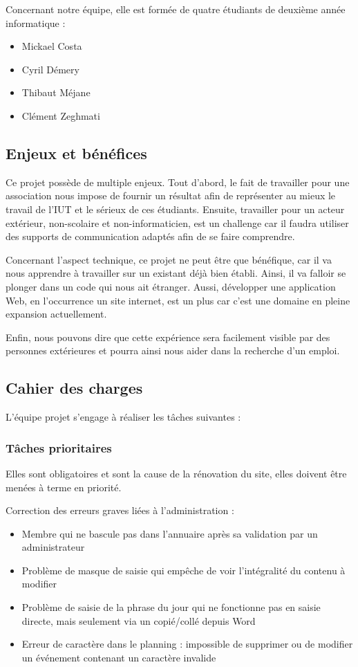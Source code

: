 \documentclass[11pt]{report}
\begin{document}
\par Concernant notre équipe, elle est formée de quatre étudiants de deuxième 
année informatique : 
\begin{itemize}
    \item Mickael Costa
    \item Cyril Démery
    \item Thibaut Méjane
    \item Clément Zeghmati
\end{itemize}


\subsection{Enjeux et bénéfices}
Ce projet possède de multiple enjeux. Tout d'abord, le fait de travailler pour 
une association nous impose de fournir un résultat afin de représenter au mieux 
le travail de l'IUT et le sérieux de ces étudiants. Ensuite, travailler pour 
un acteur extérieur, non-scolaire et non-informaticien, est un challenge car il 
faudra utiliser des supports de communication adaptés afin de se faire 
comprendre. \\

\par Concernant l'aspect technique, ce projet ne peut être que bénéfique, car 
il 
va nous apprendre à travailler sur un existant déjà bien établi. Ainsi, il va 
falloir se plonger dans un code qui nous ait étranger. Aussi, développer une 
application Web, en l’occurrence un site internet, est un plus car c'est une 
domaine en pleine expansion actuellement.\\

\par Enfin, nous pouvons dire que cette expérience sera facilement visible par 
des personnes extérieures et pourra ainsi nous aider dans la recherche d'un 
emploi.
\subsection{Cahier des charges}
L'équipe projet s'engage à réaliser les tâches suivantes :
\subsubsection*{Tâches prioritaires}
Elles sont obligatoires et sont la cause de la rénovation du site, elles doivent 
être menées à terme en priorité. 

Correction des erreurs graves liées à l'administration :
\begin{itemize}
\item Membre qui ne bascule pas dans l'annuaire après sa validation par un
administrateur
\item Problème de masque de saisie qui empêche de voir l'intégralité du contenu
à modifier 
\item Problème de saisie de la phrase du jour qui ne fonctionne pas en saisie
directe, mais seulement via un copié/collé depuis Word
\item Erreur de caractère dans le planning : impossible de supprimer ou de
modifier un événement contenant un caractère invalide
\end{itemize}
\end{document}
